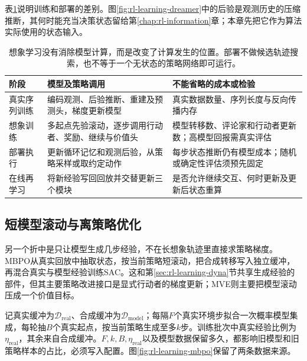 表\ref{tab:rl-learning-imagination-cost}说明训练和部署的差别。图\ref{fig:rl-learning-dreamer}中的后验是观测历史的压缩推断，其何时能充当决策状态留给第\ref{chap:rl-information}章；本章先把它作为算法实际使用的状态输入。

\begin{table}[t]
  \centering
  \small
  \begin{tabularx}{\linewidth}{>{\raggedright\arraybackslash}p{24mm} >{\raggedright\arraybackslash}X >{\raggedright\arraybackslash}X}
    \toprule
    阶段 & 模型及策略调用 & 不能省略的成本或检验 \\
    \midrule
    真实序列训练 & 编码观测、后验推断、重建及预测头，梯度更新模型 & 真实数据数量、序列长度与反向传播内存 \\
    想象训练 & 多起点先验滚动，逐步调用行动者、奖励、继续与价值头 & 模型转移数、评论家和行动者更新数；高模型回报需真实评估 \\
    部署执行 & 更新循环记忆和观测后验，从策略采样或取约定动作 & 每步状态推断仍有模型成本；随机或确定性评估须预先固定 \\
    在线再学习 & 将新经验写回回放并交替更新三个模块 & 是否允许继续交互、何时更新及更新后状态重算 \\
    \bottomrule
  \end{tabularx}
  \caption{想象学习没有消除模型计算，而是改变了计算发生的位置。部署不做候选轨迹搜索，也不等于一个无状态的策略网络即可运行。}
  \label{tab:rl-learning-imagination-cost}
\end{table}

\subsection{短模型滚动与离策略优化}
\label{sec:rl-learning-mbpo}

另一个折中是只让模型生成几步经验，不在长想象轨迹里直接求策略梯度。MBPO从真实回放中抽取状态，按当前策略短滚动，把合成转移写入独立缓冲，再混合真实与模型经验训练SAC。这和第\ref{sec:rl-learning-dyna}节共享生成经验的部件，但其主要策略改进接口是显式行动者的梯度更新；MVE则主要把模型滚动压成一个价值目标。

记真实缓冲为$\mathcal D_{\mathrm{real}}$、合成缓冲为$\mathcal D_{\mathrm{model}}$；每隔$F$个真实环境步拟合一次概率模型集成，每轮抽$B$个真实起点，按当前策略生成至多$k$步。训练批次中真实经验比例为$\eta_{\mathrm{real}}$，其余来自合成缓冲。$F,k,B,\eta_{\mathrm{real}}$以及模型数据保留多久，都影响旧模型和旧策略样本的占比，必须写入配置。图\ref{fig:rl-learning-mbpo}保留了两条数据来源。

